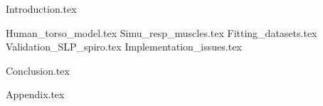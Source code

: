 \documentclass[a4, 11pt, twoside]{scrbook}
\begin{document}


\cleardoublepage



\cleardoublepage



\cleardoublepage

\renewcommand\contentsname{Table of Contents}
\tableofcontents
\cleardoublepage

\listoffigures
{}
\cleardoublepage

\listoftables
{}
\cleardoublepage


{Introduction.tex}

{Human_torso_model.tex}
{Simu_resp_muscles.tex}
{Fitting_datasets.tex}
{Validation_SLP_spiro.tex}
{Implementation_issues.tex}

{Conclusion.tex}

\appendix
{Appendix.tex}



\makeatletter
\if@twoside
	\fancyhead[LO]{}
\else
	\fancyhead[LO]{\textbf{\nouppercase{\rightmark}}}
\fi
\makeatother

\nocite{*}



\end{document}
